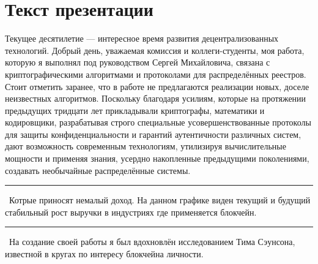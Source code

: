 \documentclass[12pt]{article}
\renewcommand{\line}{\noindent\rule{\textwidth}{1pt}}
\begin{document}
\section*{Текст презентации}
Текущее  десятилетие --- интересное время развития децентрализованных
технологий. Добрый день, уважаемая комиссия и коллеги-студенты, моя работа,
которую я выполнял под руководством Сергей Михайловича, связана с
криптографическими алгоритмами и протоколами для распределённых реестров.
Стоит отметить заранее, что в работе не предлагаются реализации новых, доселе
неизвестных алгоритмов. Поскольку благодаря усилиям,  которые  на  протяжении
предыдущих тридцати  лет  прикладывали криптографы,  математики  и кодировщики,
разрабатывая  строго  специальные усовершенствованные  протоколы для  защиты
конфиденциальности  и гарантий аутентичности  различных  систем, дают
возможность современным технологиям, утилизируя вычислительные мощности и
применяя знания, усердно накопленные предыдущими поколениями, создавать
необычайные распределённые системы.\\
\line\
Котрые приносят немалый доход. На данном графике виден текущий и будущий
стабильный рост выручки в индустриях где применяется блокчейн.\\
\line\
На создание своей работы я был вдохновлён исследованием Тима Сэунсона,
известной в кругах по интересу блокчейна личности.
\end{document}
